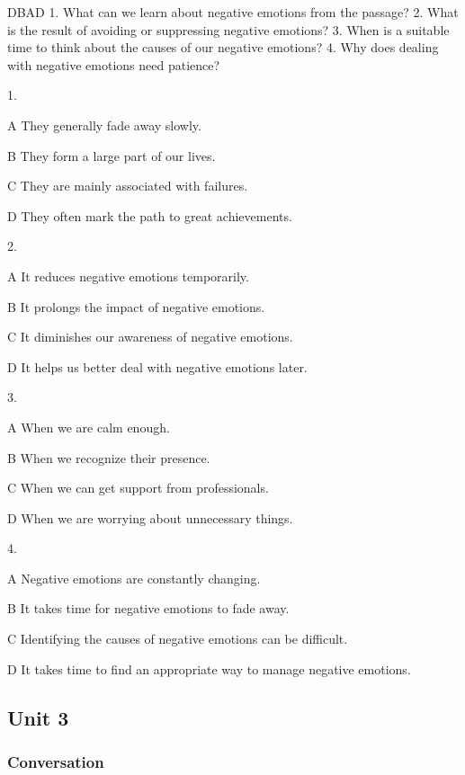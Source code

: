 \begin{enumerate}
	DBAD
	1. What can we learn about negative emotions from the passage?
	2. What is the result of avoiding or suppressing negative emotions?
	3. When is a suitable time to think about the causes of our negative emotions?
	4. Why does dealing with negative emotions need patience?
	
	
	1.
	
	A
	They generally fade away slowly.
	
	B
	They form a large part of our lives.
	
	C
	They are mainly associated with failures.
	
	D
	They often mark the path to great achievements.
	
	2.
	
	A
	It reduces negative emotions temporarily.
	
	B
	It prolongs the impact of negative emotions.
	
	C
	It diminishes our awareness of negative emotions.
	
	D
	It helps us better deal with negative emotions later.
	
	3.
	
	A
	When we are calm enough.
	
	B
	When we recognize their presence.
	
	C
	When we can get support from professionals.
	
	D
	When we are worrying about unnecessary things.
	
	4.
	
	A
	Negative emotions are constantly changing.
	
	B
	It takes time for negative emotions to fade away.
	
	C
	Identifying the causes of negative emotions can be difficult.
	
	D
	It takes time to find an appropriate way to manage negative emotions.
\end{enumerate}



\newpage
\subsection{Unit 3}

\subsubsection{Conversation}

